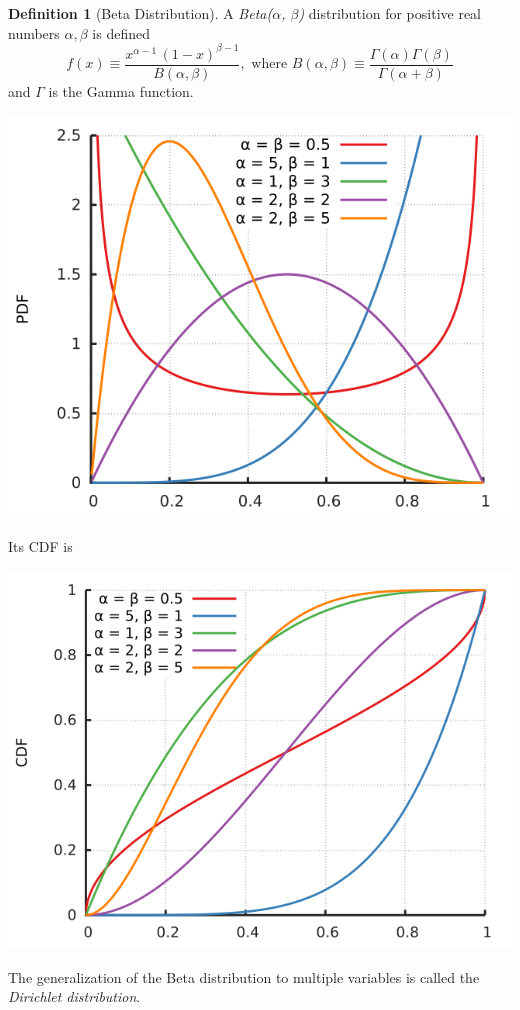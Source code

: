 \documentclass{article}
\theoremstyle{remark}
\theoremstyle{definition}
\newtheorem{definition}{Definition}[section]
\begin{document}
\begin{definition}[Beta Distribution]
A \textit{Beta($\alpha$, $\beta$)} distribution for positive real numbers $\alpha, \beta$ is defined
\[f(x) \equiv \frac{x^{\alpha-1} \,(1-x)^{\beta-1}}{B(\alpha, \beta)}, \text{ where } B(\alpha, \beta) \equiv \frac{\Gamma(\alpha) \Gamma(\beta)}{\Gamma(\alpha + \beta)}\]
and $\Gamma$ is the Gamma function. 
\begin{center}
    \includegraphics[scale=0.4]{img/Beta_Distribution_Model.png}
\end{center}
Its CDF is
\begin{center}
    \includegraphics[scale=0.4]{img/Beta_Distribution_Model_2.png}
\end{center}
The generalization of the Beta distribution to multiple variables is called the \textit{Dirichlet distribution}. 
\end{definition}
\end{document}

